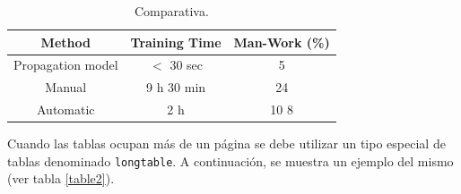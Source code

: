 \begin{table}
  \renewcommand{\arraystretch}{1.3}
  \caption{Comparativa.}
  \label{tab:table1}
  \begin{center}
    \begin{tabular}{|c|c|c|}
      \hline
      Method & Training Time & Man-Work (\%)\\
      \hline
      Propagation model & $<$ 30 sec & 5\\
      \hline
      Manual & 9 h 30 min & 24\\
      \hline
      Automatic & 2 h & 10 8\\
      \hline
    \end{tabular}
  \end{center}
\end{table}

Cuando las tablas ocupan más de un página se debe utilizar un tipo especial de tablas denominado \texttt{longtable}. A continuación, se muestra un ejemplo del mismo (ver tabla \ref{table2}).


